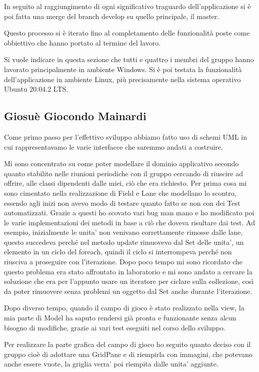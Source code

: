 \documentclass[a4paper,12pt]{report}
\begin{document}
In seguito al raggiungimento di ogni significativo traguardo dell'applicazione si è poi fatta una merge 
del branch develop su quello principale, il master.

Questo processo si è iterato fino al completamento delle funzionalità poste come obbiettivo che hanno portato
al termine del lavoro.

Si vuole indicare in questa sezione che tutti e quattro i membri del gruppo hanno lavorato principalmente in ambiente 
Windows. Si è poi testata la funzionalità dell'applicazione in ambiente Linux, più precisamente nella sistema operativo
Ubuntu 20.04.2 LTS.

\subsection*{Giosuè Giocondo Mainardi}
Come primo passo per l'effettivo sviluppo abbiamo fatto uso di schemi UML in cui rappresentavamo le varie interfacce che saremmo
andati a costruire.

Mi sono concentrato su come poter modellare il dominio applicativo secondo quanto stabilito nelle riunioni periodiche con
il gruppo cercando di riuscire ad offrire, alle classi dipendenti dalle miei, ciò che era richiesto.
Per prima cosa mi sono cimentato nella realizzazione di Field e Lane che modellano lo scontro, essendo agli inizi non avevo modo 
di testare quanto fatto se non con dei Test automatizzati. Grazie a questi ho scovato vari bug man mano e ho modificato poi 
le varie implementazioni dei metodi in base a ciò che doveva risultare dai test. Ad esempio, inizialmente le unita’ non 
venivano correttamente rimosse dalle lane, questo succedeva perché nel metodo update rimuovevo dal Set delle unita’, un elemento 
in un ciclo del foreach, quindi il ciclo si interrompeva perché non riusciva a proseguire con l'iterazione.
Dopo poco tempo mi sono ricordato che questo problema era stato affrontato in laboratorio e mi sono andato a cercare la soluzione
che era per l'appunto usare un iteratore per ciclare sulla collezione, così da poter rimuovere senza problemi un oggetto dal Set
anche durante l'iterazione.

Dopo diverso tempo, quando il campo di gioco è stato realizzato nella view, la mia parte di Model ha saputo rendersi già pronta
e funzionante senza alcun bisogno di modifiche, grazie ai vari test eseguiti nel corso dello sviluppo.

Per realizzare la parte grafica del campo di gioco ho seguito quanto deciso con il gruppo cioè di adottare una GridPane e di riempirla
con immagini, che potevano anche essere vuote, la griglia verra’ poi riempita dalle unita’ aggiunte.
\end{document}
